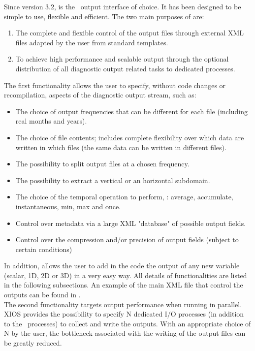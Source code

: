 \documentclass[../main/NEMO_manual]{subfiles}
\begin{document}
Since version 3.2,  is the \NEMO\ output interface of choice.
It has been designed to be simple to use, flexible and efficient.
The two main purposes of  are:

\begin{enumerate}
\item The complete and flexible control of the output files through external XML files adapted by
  the user from standard templates.
\item To achieve high performance and scalable output through the optional distribution of
  all diagnostic output related tasks to dedicated processes.
\end{enumerate}

\noindent The first functionality allows the user to specify, without code changes or recompilation,
aspects of the diagnostic output stream, such as:

\begin{itemize}
\item The choice of output frequencies that can be different for each file (including real months and years).
\item The choice of file contents; includes complete flexibility over which data are written in which files
  (the same data can be written in different files).
\item The possibility to split output files at a chosen frequency.
\item The possibility to extract a vertical or an horizontal subdomain.
\item The choice of the temporal operation to perform, \eg: average, accumulate, instantaneous, min, max and once.
\item Control over metadata via a large XML "database" of possible output fields.
\item Control over the compression and/or precision of output fields (subject to certain conditions)
\end{itemize}

\noindent In addition,   allows the user to add in the code the output of any new
variable (scalar, 1D, 2D or 3D) in a very easy way.  All details of 
functionalities are listed in the following subsections.  An example of the main XML file
that control the outputs can be found in .\\

\noindent The second functionality targets output performance when running in parallel.  XIOS
provides the possibility to specify N dedicated I/O processes (in addition to the \NEMO\
processes) to collect and write the outputs.  With an appropriate choice of N by the user,
the bottleneck associated with the writing of the output files can be greatly reduced.
\end{document}
